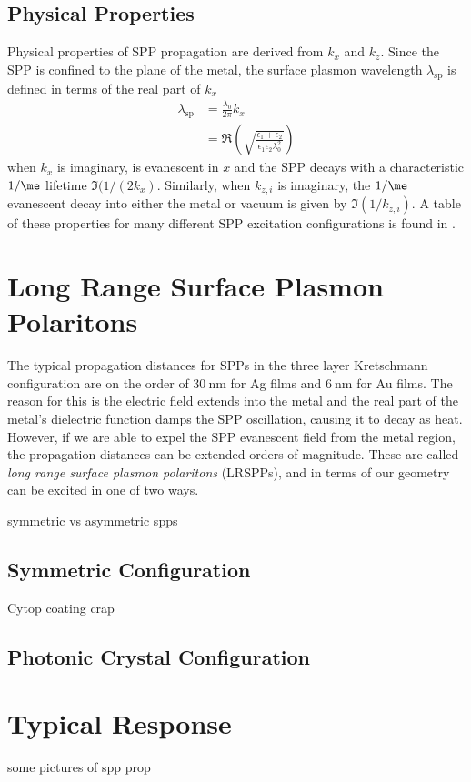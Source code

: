 \subsection{Physical Properties}
Physical properties of SPP propagation are derived from $k_x$ and $k_z$.
Since the SPP is confined to the plane of the metal, the surface plasmon
wavelength $\lambda_\text{sp}$ is defined in terms of the real part of
$k_x$
\begin{align}
\lambda_\text{sp} &= \frac{\lambda_0}{2 \pi} k_x\\
& = \Re\left(\sqrt{
  \frac {\epsilon_1+\epsilon_2}
   {\epsilon_1 \epsilon_2 \lambda_0^2}
}\right)
\end{align}
when $k_x$ is imaginary,  is evanescent in
$x$ and the SPP decays with a characteristic $1/\me$ lifetime
$\Im(1/(2k_x)$.  Similarly, when $k_{z,i}$ is imaginary, the
$1/\me$ evanescent decay into either the metal or vacuum is given by
$\Im(1/k_{z,i})$.  A table of these properties for many different SPP
excitation configurations is found in .

\section{Long Range Surface Plasmon Polaritons}
The typical propagation distances for SPPs in the three layer Kretschmann
configuration are on the order of $\SI{30}{\nano\meter}$ for Ag films and
$\SI{6}{\nano\meter}$ for Au films.  The reason for this is the electric
field extends into the metal and the real part of the metal's dielectric
function damps the SPP oscillation, causing it to decay as heat.  However,
if we are able to expel the SPP evanescent field from the metal region, the
propagation distances can be extended orders of magnitude.  These are
called \textit{long range surface plasmon polaritons} (LRSPPs), and in
terms of our geometry can be excited in one of two ways.

symmetric vs asymmetric spps

\subsection{Symmetric Configuration}
Cytop coating crap
\subsection{Photonic Crystal Configuration}

\section{Typical Response}
some pictures of spp prop
